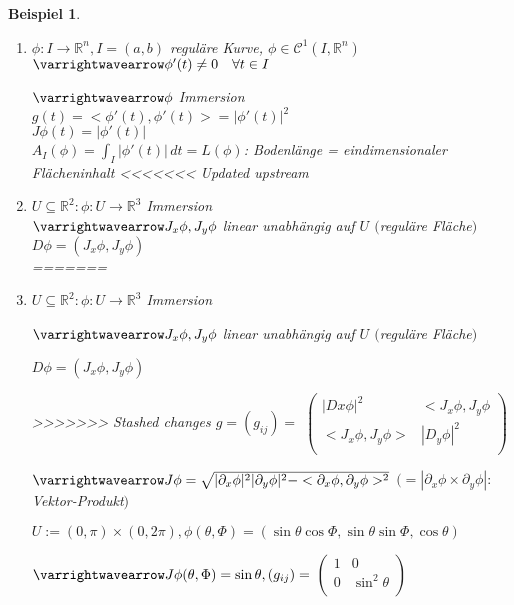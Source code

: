\documentclass[11pt]{memoir}
\theoremstyle{changebreak}
\newtheorem{Beispiel}{Beispiel}[chapter]
\begin{document}
\begin{Beispiel}
\begin{enumerate}
	\item $\phi: I \rightarrow \mathbb R^n, I = (a, b)$ reguläre Kurve, $\phi \in \mathscr C^1(I, \mathbb R^n)$ $\varrightwavearrow \phi'(t) \ne 0 \quad \forall t\in I $
	\par
	$\varrightwavearrow \phi$ Immersion \\
	$g(t) = <\phi'(t), \phi'(t) > = |\phi'(t)|^2$ \\
	$J\phi(t) = |\phi'(t)|$ \\
	$A_I(\phi) = \int_I |\phi'(t)|\, dt = L(\phi)$: Bodenlänge = eindimensionaler Flächeninhalt
<<<<<<< Updated upstream

	\item $U \subseteq \mathbb R^2: \phi: U \rightarrow \mathbb R^3$ Immersion \\
	$\varrightwavearrow J_x \phi, J_y \phi$ linear unabhängig auf $U$ $($reguläre Fläche$)$\\
	$D\phi = (J_x \phi, J_y \phi)$ \\
=======
	
	\item $U \subseteq \mathbb R^2: \phi: U \rightarrow \mathbb R^3$ Immersion 
	\par
	$\varrightwavearrow J_x \phi, J_y \phi$ linear unabhängig auf $U$ $($reguläre Fläche$)$
	\par
	$D\phi = (J_x \phi, J_y \phi)$ 
	\par
>>>>>>> Stashed changes
	$g= (g_{ij}) =$
	$\begin{pmatrix}
      		|Dx\phi|^2 & 	<J_x\phi, J_y\phi \\
      		<J_x\phi, J_y\phi> &  	|D_y\phi|^2 \\
	\end{pmatrix}$ 
	\par\bigskip
	$\varrightwavearrow J\phi = \sqrt{|\partial_x \phi|^2 |\partial_y \phi|^2 - <\partial_x\phi, \partial_y\phi>^2}$ $(= |\partial_x\phi \times \partial_y \phi|: $Vektor-Produkt$)$ 
	\par
	$U:= (0, \pi) \times (0, 2\pi), \phi(\theta, \Phi) = (\sin\theta\cos\Phi, \sin\theta\sin\Phi, \cos\theta)$ 
	\par
	$\varrightwavearrow J\phi(\theta, \Phi) = \sin\theta, (g_{ij}) = $
	$\begin{pmatrix}
		1 & 0 \\
		0 & \sin^2 \theta \\
	\end{pmatrix}$


\end{enumerate}
\end{Beispiel}
\end{document}
